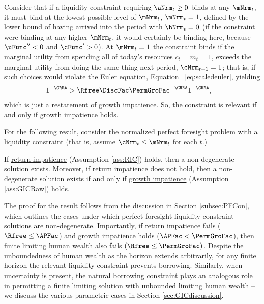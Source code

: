 \documentclass[BufferStockTheory]{subfiles}
\begin{document}
Consider that if a liquidity constraint requiring $\aNrm_{t} \geq 0$ binds at any $\mNrm_{t}$, it must bind at the lowest possible level of $\mNrm_{t}$, $\mNrm_{t}=1$, defined by the lower bound of having arrived into the period with $\bNrm_{t}=0$ (if the constraint were binding at any higher $\mNrm_{t}$, it would certainly be binding here, because $\uFunc^{\prime\prime}<0$ and $\cFunc^{\prime}>0$). At $\mNrm_{t}=1$ the constraint binds if the marginal utility from spending all of today's resources $c_{t}=m_{t}=1$, exceeds the marginal utility from doing the same thing next period, $\cNrm_{t+1}=1$; that is, if such choices would violate the Euler equation, Equation ~\eqref{eq:scaledeuler}, yielding
\begin{align}
  1^{-\CRRA}  & > \Rfree \DiscFac \PermGroFac^{-\CRRA}1^{-\CRRA},  \label{eq:LiqConstrBinds}
\end{align}
which is just a restatement of \hyperlink{GIC}{growth impatience}.
So, the constraint is relevant if and only if \hyperlink{GICRaw}{growth impatience} holds.

For the following result, consider the normalized perfect foresight problem with a liquidity constraint (that is, assume $\cNrm_{t}\leq \mNrm_{t}$ for each $t$.)

\begin{proposition}\label{prop:PFCExist}
 If \hyperlink{RIC}{return impatience} (Assumption \ref{ass:RIC}) holds, then a non-degenerate solution exists. Moreover, if \hyperlink{RIC}{return impatience} does not hold, then a non-degenerate solution exists if and only if \hyperlink{GICRaw}{growth impatience} (Assumption \ref{ass:GICRaw}) holds. 
\end{proposition}

The proof for the result follows from the discussion in Section \ref{subsec:PFCon}, which outlines the cases under which perfect foresight liquidity constraint solutions are non-degenerate. 
Importantly, if \hyperlink{RIC}{return impatience} fails ($\Rfree\leq \APFac$) and \hyperlink{GIC}{growth impatience} holds ($\APFac<\PermGroFac$), then \hyperlink{FHWC}{finite limiting  human wealth} also fails $(\Rfree \leq \PermGroFac)$.
Despite the unboundedness of human wealth as the horizon extends arbitrarily, for any finite horizon the relevant liquidity constraint prevents borrowing.
Similarly, when uncertainty is present, the natural borrowing constraint plays an analogous role in permitting a finite limiting solution with unbounded limiting human wealth -- we discuss the various parametric cases in Section \ref{sec:GICdiscussion}.
\end{document}
